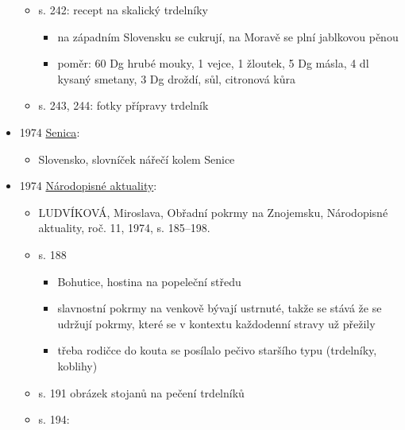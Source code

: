 \begin{itemize}
  \begin{itemize}
  \tightlist
  \item
    s. 242: recept na skalický trdelníky

    \begin{itemize}
    \tightlist
    \item
      na západním Slovensku se cukrují, na Moravě se plní jablkovou
      pěnou
    \item
      poměr: 60 Dg hrubé mouky, 1 vejce, 1 žloutek, 5 Dg másla, 4 dl
      kysaný smetany, 3 Dg droždí, sůl, citronová kůra
    \end{itemize}
  \item
    s. 243, 244: fotky přípravy trdelník
  \end{itemize}
\item
  1974
  \href{https://dikda.snk.sk/uuid/uuid:d94332c2-6255-4120-ae75-24a5112dd9b9}{Senica}:

  \begin{itemize}
  \tightlist
  \item
    Slovensko, slovníček nářečí kolem Senice
  \end{itemize}
\item
  1974
  \href{https://ceskadigitalniknihovna.cz/uuid/uuid:7c79b650-3b72-11e5-b57a-005056825209}{Národopisné
  aktuality}:

  \begin{itemize}
  \tightlist
  \item
    LUDVÍKOVÁ, Miroslava, Obřadní pokrmy na Znojemsku, Národopisné
    aktuality, roč. 11, 1974, s. 185--198.
  \item
    s. 188

    \begin{itemize}
    \tightlist
    \item
      Bohutice, hostina na popeleční středu
    \item
      slavnostní pokrmy na venkově bývají ustrnuté, takže se stává že se
      udržují pokrmy, které se v kontextu každodenní stravy už přežily
    \item
      třeba rodičce do kouta se posílalo pečivo staršího typu
      (trdelníky, koblihy)
    \end{itemize}
  \item
    s. 191 obrázek stojanů na pečení trdelníků
  \item
    s. 194:


\end{itemize}
\end{itemize}
